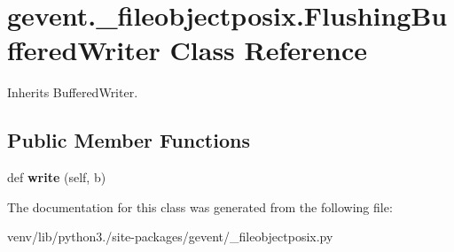 \hypertarget{classgevent_1_1__fileobjectposix_1_1_flushing_buffered_writer}{}\section{gevent.\+\_\+fileobjectposix.\+Flushing\+Buffered\+Writer Class Reference}
\label{classgevent_1_1__fileobjectposix_1_1_flushing_buffered_writer}


Inherits Buffered\+Writer.

\subsection*{Public Member Functions}
\begin{DoxyCompactItemize}
\item 
\mbox{\label{classgevent_1_1__fileobjectposix_1_1_flushing_buffered_writer_a78397a99462a162970f9e08fc187e092}} 
def {\bfseries write} (self, b)
\end{DoxyCompactItemize}


The documentation for this class was generated from the following file\+:\begin{DoxyCompactItemize}
\item 
venv/lib/python3./site-\/packages/gevent/\+\_\+fileobjectposix.\+py\end{DoxyCompactItemize}
